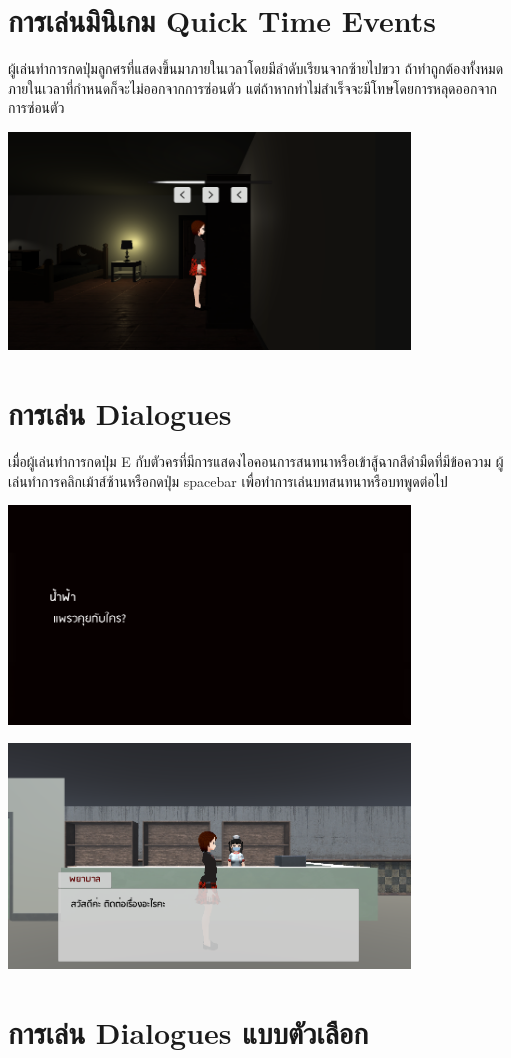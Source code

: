 \section*{การเล่นมินิเกม Quick Time Events}
ผู้เล่นทำการกดปุ่มลูกศรที่แสดงขึ้นมาภายในเวลาโดยมีลำดับเรียนจากซ้ายไปขวา ถ้าทำถูกต้องทั้งหมดภายในเวลาที่กำหนดก็จะไม่ออกจากการซ่อนตัว แต่ถ้าหากทำไม่สำเร็จจะมีโทษโดยการหลุดออกจากการซ่อนตัว
\begin{center}
    \includegraphics[width=0.8\textwidth, height=0.25\textheight]{Images/QuickTimeEvent.png}
\end{center}

\section*{การเล่น Dialogues}
เมื่อผู้เล่นทำการกดปุ่ม E กับตัวครที่มีการแสดงไอคอนการสนทนาหรือเข้าสู้ฉากสีดำมืดที่มีข้อความ ผู้เล่นทำการคลิกเม้าส์ซ้านหรือกดปุ่ม spacebar เพื่อทำการเล่นบทสนทนาหรือบทพูดต่อไป
\begin{center}
    \includegraphics[width=0.8\textwidth, height=0.25\textheight]{Images/Dialogue Cutscene.png}
\end{center}
\begin{center}
    \includegraphics[width=0.8\textwidth, height=0.25\textheight]{Images/Dialogue manage.png}
\end{center}

\section*{การเล่น Dialogues แบบตัวเลือก}
